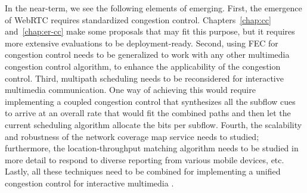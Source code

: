 
In the near-term, we see the following elements of emerging. First,
the emergence of WebRTC requires standardized congestion control.
Chapters~\ref{chap:cc} and~\ref{chap:er-cc} make some proposals that may fit
this purpose, but it requires more extensive evaluations to be deployment-ready.
Second, using FEC for congestion control needs to be generalized to work with
any other multimedia congestion control algorithm, to enhance the
applicability of the congestion control. Third, multipath scheduling needs to be reconsidered for
interactive multimedia communication. One way of achieving this would require
implementing a coupled congestion control that synthesizes all the subflow
cues to arrive at an overall rate that would fit the combined paths and then
let the current scheduling algorithm allocate the bits per subflow. Fourth,
the scalability and robustness of the network coverage map service needs to
studied; furthermore, the location-throughput matching algorithm needs to be
studied in more detail to respond to diverse reporting from
various mobile devices, etc. Lastly, all these techniques need to be combined for
implementing a unified congestion control for interactive multimedia .




